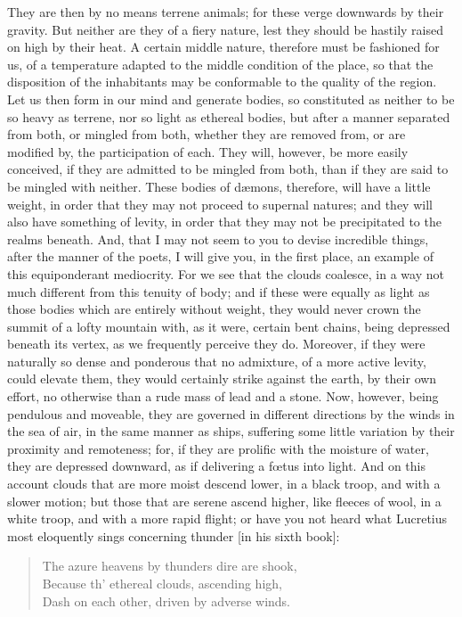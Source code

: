 \documentclass[12pt]{article}
\begin{document}
They are then by no means terrene animals; for these verge downwards by their
gravity. But neither are they of a fiery nature, lest they should be hastily
raised on high by their heat. A certain middle nature, therefore must be
fashioned for us, of a temperature adapted to the middle condition of the
place, so that the disposition of the inhabitants may be conformable to the
quality of the region.  Let us then form in our mind and generate bodies, so
constituted as neither to be so heavy as terrene, nor so light as ethereal
bodies, but after a manner separated from both, or mingled from both, whether
they are removed from, or are modified by, the participation of each. They
will, however, be more easily conceived, if they are admitted to be mingled
from both, than if they are said to be mingled with neither. These bodies of
d{\ae}mons, therefore, will have a little weight, in order that they may not
proceed to supernal natures; and they will also have something of levity, in
order that they may not be precipitated to the realms beneath. And, that I may
not seem to you to devise incredible things, after the manner of the poets, I
will give you, in the first place, an example of this equiponderant mediocrity.
For we see that the clouds coalesce, in a way not much different from this
tenuity of body; and if these were equally as light as those bodies which are
entirely without weight, they would never crown the summit of a lofty mountain
with, as it were, certain bent chains, being depressed beneath its vertex, as
we frequently perceive they do. Moreover, if they were naturally so dense and
ponderous that no admixture, of a more active levity, could elevate them, they
would certainly strike against the earth, by their own effort, no otherwise
than a rude mass of lead and a stone. Now, however, being pendulous and
moveable, they are governed in different directions by the winds in the sea of
air, in the same manner as ships, suffering some little variation by their
proximity and remoteness; for, if they are prolific with the moisture of water,
they are depressed downward, as if delivering a f{\oe}tus into light.  And on
this account clouds that are more moist descend lower, in a black troop, and
with a slower motion; but those that are serene ascend higher, like fleeces of
wool, in a white troop, and with a more rapid flight; or have you not heard
what Lucretius most eloquently sings concerning thunder [in his sixth book]:

\begin{verse}
The azure heavens by thunders dire are shook,\\
Because th' ethereal clouds, ascending high,\\
Dash on each other, driven by adverse winds.
\end{verse}
 
\end{document}
